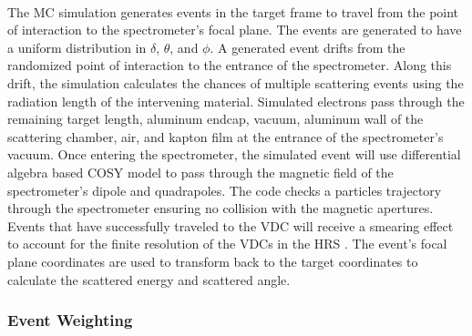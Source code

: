 \paragraph{}The MC simulation generates events in the target frame to travel from the point of interaction to the spectrometer's focal plane. The events are generated to have a uniform distribution in $\delta$, $\theta$, and $\phi$. A generated event drifts from the randomized point of interaction to the entrance of the spectrometer. Along this drift, the simulation calculates the chances of multiple scattering events using the radiation length of the intervening material. Simulated electrons pass through the remaining target length, aluminum endcap, vacuum, aluminum wall of the scattering chamber, air, and kapton film at the entrance of the spectrometer's vacuum. Once entering the spectrometer, the simulated event will use differential algebra based COSY model to pass through the magnetic field of the spectrometer's dipole and quadrapoles. The code checks a particles trajectory through the spectrometer ensuring no collision with the magnetic apertures.  Events that have successfully traveled to the VDC will receive a smearing effect to account for the finite resolution of the VDCs in the HRS \cite{HallA}. The event's focal plane coordinates are used to transform back to the target coordinates to calculate the scattered energy and scattered angle.\\ 
\subsubsection{Event Weighting}
